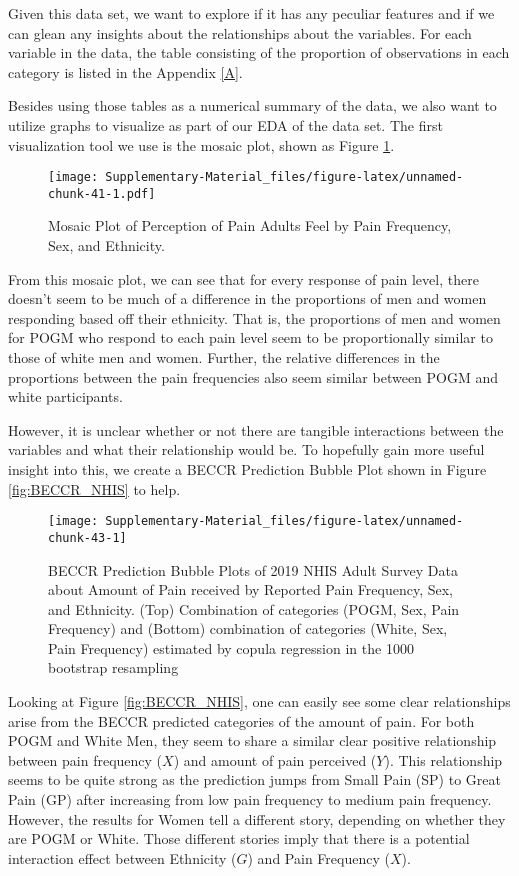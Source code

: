 \documentclass[
]{article}
\begin{document}
Given this data set, we want to explore if it has any peculiar features
and if we can glean any insights about the relationships about the
variables. For each variable in the data, the table consisting of the
proportion of observations in each category is listed in the Appendix
\ref{A}.

Besides using those tables as a numerical summary of the data, we also
want to utilize graphs to visualize as part of our EDA of the data set.
The first visualization tool we use is the mosaic plot, shown as Figure
\ref{fig:mp_NHIS}.

\begin{figure}
\centering
\texttt{[image: Supplementary-Material\_files/figure-latex/unnamed-chunk-41-1.pdf]}
\caption{\label{fig:mp_NHIS}Mosaic Plot of Perception of Pain Adults
Feel by Pain Frequency, Sex, and Ethnicity.}
\end{figure}

From this mosaic plot, we can see that for every response of pain level,
there doesn't seem to be much of a difference in the proportions of men
and women responding based off their ethnicity. That is, the proportions
of men and women for POGM who respond to each pain level seem to be
proportionally similar to those of white men and women. Further, the
relative differences in the proportions between the pain frequencies
also seem similar between POGM and white participants.

However, it is unclear whether or not there are tangible interactions
between the variables and what their relationship would be. To hopefully
gain more useful insight into this, we create a BECCR Prediction Bubble
Plot shown in Figure \ref{fig:BECCR_NHIS} to help.

\begin{figure}
\texttt{[image: Supplementary-Material\_files/figure-latex/unnamed-chunk-43-1]} \caption[Prediction Bubble Plots of 2019 NHIS Adult Survey Data about Amount of Pain received by Reported Pain Frequency, Sex, and Ethnicity.]{\label{fig:BECCR_NHIS}BECCR Prediction Bubble Plots of 2019 NHIS Adult Survey Data about Amount of Pain received by Reported Pain Frequency, Sex, and Ethnicity. (Top) Combination of categories (POGM, Sex, Pain Frequency) and (Bottom) combination of categories (White, Sex, Pain Frequency) estimated by copula regression in the 1000 bootstrap resampling}\label{fig:unnamed-chunk-43}
\end{figure}

Looking at Figure \ref{fig:BECCR_NHIS}, one can easily see some clear
relationships arise from the BECCR predicted categories of the amount of
pain. For both POGM and White Men, they seem to share a similar clear
positive relationship between pain frequency (\(X\)) and amount of pain
perceived (\(Y\)). This relationship seems to be quite strong as the
prediction jumps from Small Pain (SP) to Great Pain (GP) after
increasing from low pain frequency to medium pain frequency. However,
the results for Women tell a different story, depending on whether they
are POGM or White. Those different stories imply that there is a
potential interaction effect between Ethnicity (\(G\)) and Pain
Frequency (\(X\)).
\end{document}
